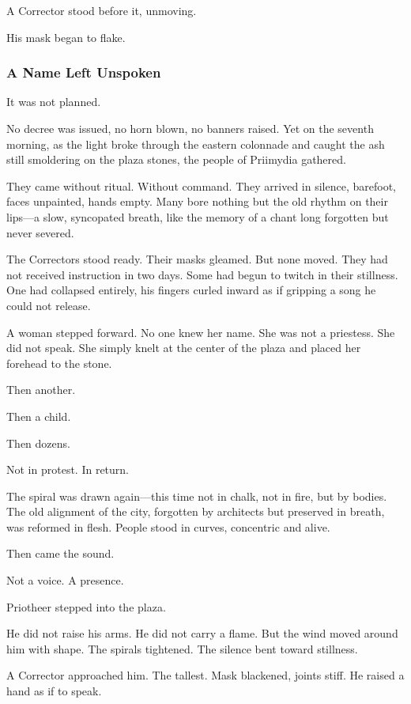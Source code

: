 \documentclass[12pt]{article}
\begin{document}
A Corrector stood before it, unmoving.

His mask began to flake.

\dotfill

\subsubsection*{A Name Left Unspoken}

It was not planned.

No decree was issued, no horn blown, no banners raised. Yet on the seventh morning, as the light broke through the eastern colonnade and caught the ash still smoldering on the plaza stones, the people of Priimydia gathered.

They came without ritual. Without command. They arrived in silence, barefoot, faces unpainted, hands empty. Many bore nothing but the old rhythm on their lips—a slow, syncopated breath, like the memory of a chant long forgotten but never severed.

The Correctors stood ready. Their masks gleamed. But none moved. They had not received instruction in two days. Some had begun to twitch in their stillness. One had collapsed entirely, his fingers curled inward as if gripping a song he could not release.

A woman stepped forward. No one knew her name. She was not a priestess. She did not speak. She simply knelt at the center of the plaza and placed her forehead to the stone.

Then another.

Then a child.

Then dozens.

Not in protest. In return.

The spiral was drawn again—this time not in chalk, not in fire, but by bodies. The old alignment of the city, forgotten by architects but preserved in breath, was reformed in flesh. People stood in curves, concentric and alive.

Then came the sound.

Not a voice. A presence.

Priotheer stepped into the plaza.

He did not raise his arms. He did not carry a flame. But the wind moved around him with shape. The spirals tightened. The silence bent toward stillness.

A Corrector approached him. The tallest. Mask blackened, joints stiff. He raised a hand as if to speak.
\end{document}
